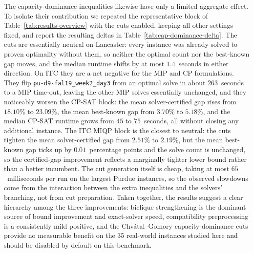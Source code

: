 \documentclass[11pt]{article}
\begin{document}
The capacity-dominance inequalities likewise have only a limited aggregate effect. To isolate their contribution we repeated the representative block of Table~\ref{tab:results-overview} with the cuts enabled, keeping all other settings fixed, and report the resulting deltas in Table~\ref{tab:cap-dominance-delta}. The cuts are essentially neutral on Lancaster: every instance was already solved to proven optimality without them, so neither the optimal count nor the best-known gap moves, and the median runtime shifts by at most $1.4$~seconds in either direction. On ITC they are a net negative for the MIP and CP formulations. They flip \texttt{pu-d9-fal19\_week2\_day3} from an optimal solve in about $263$~seconds to a MIP time-out, leaving the other MIP solves essentially unchanged, and they noticeably worsen the CP-SAT block: the mean solver-certified gap rises from $18.10\%$ to $23.09\%$, the mean best-known gap from $3.70\%$ to $5.18\%$, and the median CP-SAT runtime grows from $45$ to $75$~seconds, all without closing any additional instance. The ITC MIQP block is the closest to neutral: the cuts tighten the mean solver-certified gap from $2.51\%$ to $2.19\%$, but the mean best-known gap ticks up by $0.01$~percentage points and the solve count is unchanged, so the certified-gap improvement reflects a marginally tighter lower bound rather than a better incumbent. The cut generation itself is cheap, taking at most $65$~milliseconds per run on the largest Purdue instances, so the observed slowdowns come from the interaction between the extra inequalities and the solvers' branching, not from cut preparation. Taken together, the results suggest a clear hierarchy among the three improvements: biclique strengthening is the dominant source of bound improvement and exact-solver speed, compatibility preprocessing is a consistently mild positive, and the Chv\'atal--Gomory capacity-dominance cuts provide no measurable benefit on the 35 real-world instances studied here and should be disabled by default on this benchmark.
\end{document}
